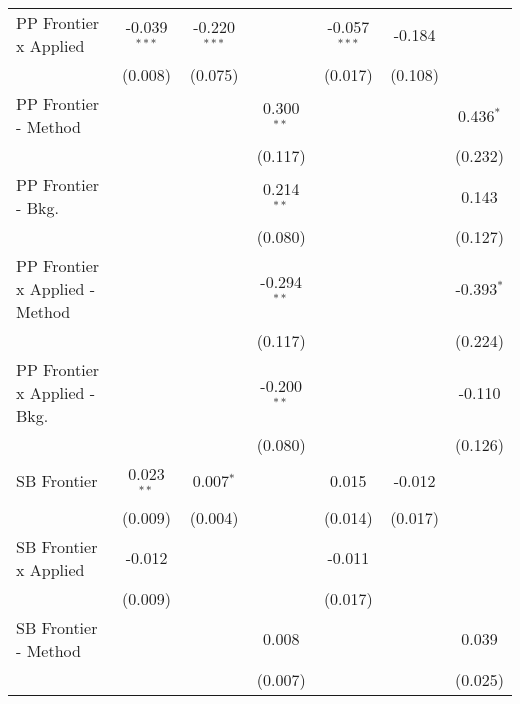 \begin{tabular}{lcccccc}
   PP Frontier x Applied          & -0.039$^{***}$ & -0.220$^{***}$ &                & -0.057$^{***}$ & -0.184         &   \\   
                                  & (0.008)        & (0.075)        &                & (0.017)        & (0.108)        &   \\   
   PP Frontier - Method           &                &                & 0.300$^{**}$   &                &                & 0.436$^{*}$\\   
                                  &                &                & (0.117)        &                &                & (0.232)\\   
   PP Frontier - Bkg.             &                &                & 0.214$^{**}$   &                &                & 0.143\\   
                                  &                &                & (0.080)        &                &                & (0.127)\\   
   PP Frontier x Applied - Method &                &                & -0.294$^{**}$  &                &                & -0.393$^{*}$\\   
                                  &                &                & (0.117)        &                &                & (0.224)\\   
   PP Frontier x Applied - Bkg.   &                &                & -0.200$^{**}$  &                &                & -0.110\\   
                                  &                &                & (0.080)        &                &                & (0.126)\\   
   SB Frontier                    & 0.023$^{**}$   & 0.007$^{*}$    &                & 0.015          & -0.012         &   \\   
                                  & (0.009)        & (0.004)        &                & (0.014)        & (0.017)        &   \\   
   SB Frontier x Applied          & -0.012         &                &                & -0.011         &                &   \\   
                                  & (0.009)        &                &                & (0.017)        &                &   \\   
   SB Frontier - Method           &                &                & 0.008          &                &                & 0.039\\   
                                  &                &                & (0.007)        &                &                & (0.025)\\   

\end{tabular}
